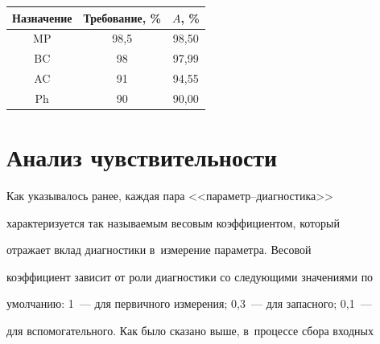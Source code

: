 \begin{table}\small %


\begin{center}


\parbox{60mm}{}


\vspace*{2ex}





\begin{tabular}{|c|c|c|}


\hline


Назначение&Требование, \%&$A$, \%\\


\hline


MP&98,5&98,50\\


BC&98\hphantom{,5}&97,99\\


AC&91\hphantom{,5}&94,55\\


Ph&90\hphantom{,5}&90,00\\


\hline


\end{tabular}


\end{center}


\end{table}





\section{Анализ чувствительности}





Как указывалось ранее, каждая пара <<па\-ра\-метр--диаг\-но\-сти\-ка>> 


характеризуется так на\-зы\-ва\-емым весовым коэффициентом, который 


отражает вклад диагностики в~измерение па\-ра\-мет\-ра. Весовой 


коэффициент зависит от роли диагностики со сле\-ду\-ющи\-ми значениями по 


умолчанию: 1~--- для первичного измерения; 0,3~--- для запасного; 0,1~--- 


для вспомогательного. Как было сказано выше, в~процессе сбора входных 


